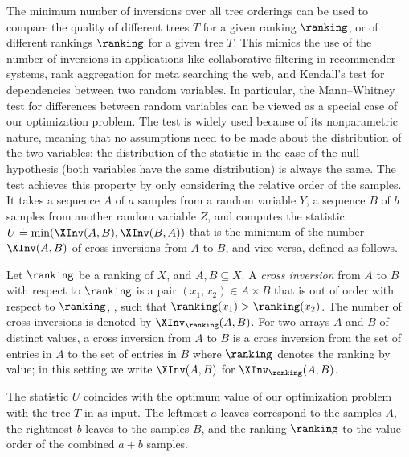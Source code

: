 \documentclass{toc}
\begin{document}
The minimum number of inversions over all tree orderings %
%
can be used to compare the quality of different trees $T$ for a given ranking $\ranking$, or of different rankings $\ranking$ for a given tree $T$. This mimics the use of the number of inversions in applications like collaborative filtering in recommender systems, rank aggregation for meta searching the web, and Kendall's test for dependencies between two random variables. 
In particular, the Mann--Whitney test for differences between random variables can be viewed as a special case of our optimization problem. The test is widely used because of its nonparametric nature, meaning that no assumptions need to be made about the distribution of the two variables; the distribution of the statistic in the case of the null hypothesis (both variables have the same distribution) is always the same. The test achieves this property by only considering the relative order of the samples. It takes a sequence $A$ of $a$ samples from a random variable $Y$, a sequence $B$ of $b$ samples from another random variable $Z$, and computes the statistic $U \doteq \min(\XInv(A,B),\XInv(B,A))$ that is the minimum of the number $\XInv(A,B)$ of cross inversions from $A$ to $B$, and vice versa, defined as follows.  %
%
\begin{definition}
Let $\ranking$ be a ranking of $X$, and $A, B \subseteq X$. A \emph{cross inversion} from $A$ to $B$ with respect to $\ranking$ is a pair $(x_1,x_2) \in A \times B$ that is out of order with respect to $\ranking$, \ie, such that $\ranking(x_1) > \ranking(x_2)$. The number of cross inversions is denoted by $\XInv_\ranking(A,B)$.
For two arrays $A$ and $B$ of
%
%
distinct values, a cross inversion from $A$ to $B$ is a cross inversion from the set of entries in $A$ to the set of entries in $B$ where $\ranking$ denotes the ranking by value; in this setting we write $\XInv(A,B)$ for $\XInv_\ranking(A,B)$.
\end{definition}
The statistic $U$ coincides with the optimum value of our optimization problem with the tree $T$ in  as input. The leftmost $a$ leaves correspond to the samples $A$, the rightmost $b$ leaves to the samples $B$, and the ranking $\ranking$ to the value order of the combined $a+b$ samples.
\end{document}
